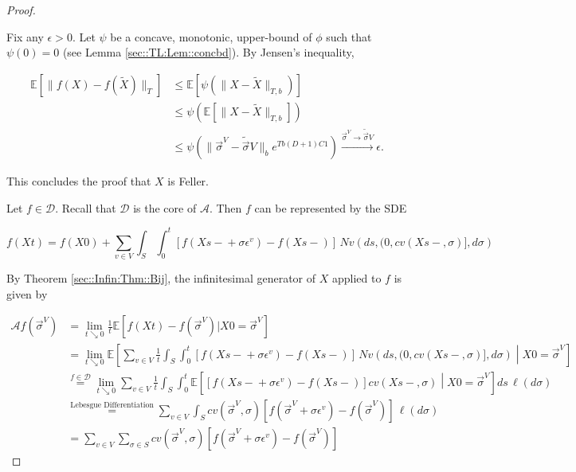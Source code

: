\documentclass[12pt]{article}
\newcommand{\mb}{\mathbb}
\newcommand{\mc}{\mathcal}
\newcommand{\ra}{\rightarrow}
\newcommand{\os}{\overset}
\newcommand{\te}{\text}
\newcommand{\ep}{\epsilon}
\newcommand{\ind}{\hspace{24pt}}
\newcommand{\ex}[1]{\mb{E}\left[#1\right]}			%
\renewcommand{\v}{v}							%
\renewcommand{\S}{S}							%
\newcommand{\s}{\sigma}							%
\newcommand{\sv}{\vec{\s}}						%
\renewcommand{\b}{b}							%
\newcommand{\ev}{\ep}							%
\newcommand{\T}{T}								%
\renewcommand{\t}{t}							%
\renewcommand{\tt}{s}							%
\newcommand{\X}{X}								%
\newcommand{\IG}{\mc{A}}						%
\newcommand{\IGr}{c}							%
\newcommand{\vind}[1]{^{#1}}					%
\newcommand{\vsi}[1]{^{#1}}						%
\newcommand{\cind}[1]{_{#1}}					%
\newcommand{\const}{C}							%
\newcommand{\degr}{D}							%
\newcommand{\core}{\mc{D}}						%
\newcommand{\poiss}{N}							%
\newcommand{\Sm}{\ell}							%
\newcommand{\alt}[1]{\widetilde{#1}}			%
\begin{document}
\begin{proof}
\begin{enumerate}[(a)]
\ind Fix any \(\ep > 0\). Let \(\psi\) be a concave, monotonic, upper-bound of \(\phi\) such that \(\psi(0) = 0\) (see Lemma \ref{sec::TL:Lem::concbd}). By Jensen's inequality,

\begin{align*}
\ex{\|f(\X{}{}) - f(\alt{\X}{}{})\|_\T} &\leq \ex{\psi\left(\|\X{}{} - \alt{\X}{}{}\|_{\T,\b{}}\right)}\\
&\leq \psi\left(\ex{\|\X{}{} - \alt{\X}{}{}\|_{\T,\b{}}}\right)\\
&\leq \psi\left(\|\sv\cind{}\vsi{V} - \alt{\sv}{}{V}\|_{\b{}}e^{\T\b{}(\degr+1)\const{1}}\right) \os{\sv\cind{}\vsi{V} \ra\alt{\sv}{}{V}}{\ra} \ep.
\end{align*}

This concludes the proof that \(\X{}{}\) is Feller.
\end{enumerate}

Let \(f \in \core\). Recall that \(\core\) is the core of \(\IG\). Then \(f\) can be represented by the SDE

\[f(\X{}{\t}) = f(\X{}{0}) + \sum_{\v \in V} \int_\S\int_0^\t [f(\X{}{\tt-} + \s\ev\vind{\v}) - f(\X{}{\tt-})]\,\poiss{\v}\left(d\tt,(0,\IGr{\v}(\X{}{\tt-},\s)],d\s\right)\]


By Theorem \ref{sec::Infin:Thm::Bij}, the infinitesimal generator of \(\X{}{}\) applied to \(f\) is given by 

\begin{align*}
\IG f(\sv\cind{}\vsi{V}) &= \lim_{\t \searrow 0} \frac{1}{\t} \ex{f(\X{}{\t}) - f(\sv\cind{}\vsi{V})|\X{}{0} = \sv\cind{}\vsi{V}}\\
&= \lim_{\t \searrow 0} \ex{\sum_{\v \in V} \frac{1}{\t}\int_\S\int_0^\t \left[f(\X{}{\tt-} + \s\ev\vind{\v}) - f(\X{}{\tt-})\right]\,\poiss{\v}\left(d\tt,(0,\IGr{\v}(\X{}{\tt-},\s)],d\s\right)\middle|\X{}{0} = \sv\cind{}\vsi{V}}\\
&\os{f \in \mc{D}}{=} \lim_{\t \searrow 0}\sum_{\v \in V} \frac{1}{\t}\int_\S\int_0^\t \ex{\left[f(\X{}{\tt-} + \s\ev\vind{\v}) - f(\X{}{\tt-})\right]\IGr{\v}(\X{}{\tt-},\s)\middle|\X{}{0} = \sv\cind{}\vsi{V}}d\tt\,\Sm(d\s)\\
&\os{\te{Lebesgue Differentiation}}{=} \sum_{\v \in V} \int_\S \IGr{\v}(\sv\cind{}\vsi{V},\s)[f(\sv\cind{}\vsi{V} + \s\ev\vind{\v}) - f(\sv\cind{}\vsi{V})]\,\Sm(d\s)\\
&= \sum_{\v \in V} \sum_{\s \in \S} \IGr{\v}(\sv\cind{}\vsi{V},\s)[f(\sv\cind{}\vsi{V} + \s\ev\vind{\v}) - f(\sv\cind{}\vsi{V})]
\end{align*}
\end{proof}
\end{document}
